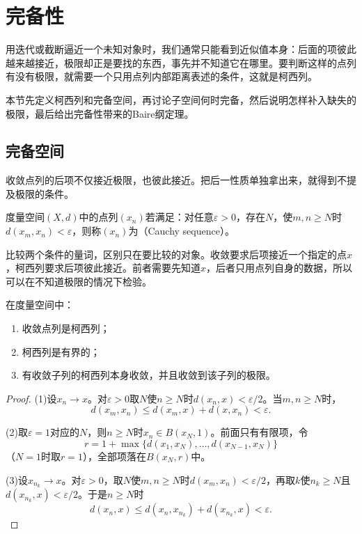 \section{完备性}
\label{sec:metric-completeness}

用迭代或截断逼近一个未知对象时，我们通常只能看到近似值本身：后面的项彼此越来越接近，极限却正是要找的东西，事先并不知道它在哪里。要判断这样的点列有没有极限，就需要一个只用点列内部距离表述的条件，这就是柯西列。

本节先定义柯西列和完备空间，再讨论子空间何时完备，然后说明怎样补入缺失的极限，最后给出完备性带来的Baire纲定理。

\subsection{完备空间}
\label{sec:metric-complete-spaces}

收敛点列的后项不仅接近极限，也彼此接近。把后一性质单独拿出来，就得到不提及极限的条件。

\begin{definition}[柯西列]
\label{def:metric-cauchy}
度量空间$(X,d)$中的点列$(x_n)$若满足：对任意$\varepsilon>0$，存在$N$，使$m,n\geq N$时$d(x_m,x_n)<\varepsilon$，则称$(x_n)$为（Cauchy sequence）。
\end{definition}

比较两个条件的量词，区别只在要比较的对象。收敛要求后项接近一个指定的点$x$，柯西列要求后项彼此接近。前者需要先知道$x$，后者只用点列自身的数据，所以可以在不知道极限的情况下检验。

\begin{lemma}[柯西列的基本性质]
\label{lem:metric-cauchy-basic}
在度量空间中：
\begin{enumerate}
\item 收敛点列是柯西列；
\item 柯西列是有界的；
\item 有收敛子列的柯西列本身收敛，并且收敛到该子列的极限。
\end{enumerate}
\end{lemma}

\begin{proof}
(1)设$x_n\to x$。对$\varepsilon>0$取$N$使$n\geq N$时$d(x_n,x)<\varepsilon/2$。当$m,n\geq N$时，
\[
d(x_m,x_n)\leq d(x_m,x)+d(x,x_n)<\varepsilon.
\]

(2)取$\varepsilon=1$对应的$N$，则$n\geq N$时$x_n\in B(x_N,1)$。前面只有有限项，令
\[
r=1+\max\{d(x_1,x_N),\ldots,d(x_{N-1},x_N)\}
\]
（$N=1$时取$r=1$），全部项落在$B(x_N,r)$中。

(3)设$x_{n_k}\to x$。对$\varepsilon>0$，取$N$使$m,n\geq N$时$d(x_m,x_n)<\varepsilon/2$，再取$k$使$n_k\geq N$且$d(x_{n_k},x)<\varepsilon/2$。于是$n\geq N$时
\[
d(x_n,x)\leq d(x_n,x_{n_k})+d(x_{n_k},x)<\varepsilon.
\]
\end{proof}

